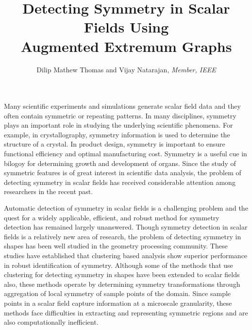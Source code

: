 \documentclass[review,journal]{vgtc}         %
\title{Detecting Symmetry in Scalar Fields Using\\Augmented Extremum Graphs}
\author{Dilip Mathew Thomas and Vijay Natarajan, \textit{Member, IEEE}}
\begin{document}

\maketitle
Many scientific experiments and simulations generate scalar field data and 
they often contain symmetric or repeating patterns. In many disciplines, 
symmetry plays an important role in studying the underlying scientific phenomena. 
For example, in crystallography, symmetry information is used to determine 
the structure of a crystal. In product design, symmetry is important to ensure
functional efficiency and optimal manufacturing cost. Symmetry is a 
useful cue in bilogoy for determining growth and development of organs. Since 
the study of symmetric features is of great interest in scientific data 
analysis, the problem of detecting symmetry in scalar fields has received 
considerable attention among researchers in the recent past.

Automatic detection of symmetry in scalar fields is a challenging problem and 
the quest for a widely applicable, efficient, and robust method for symmetry 
detection has remained largely unanswered. Though symmetry detection in scalar
fields is a relatively new area of research, the problem of detecting symmetry
in shapes has been well studied in the geometry processing community.
These studies have established that clustering based analysis show superior
performance in robust identification of symmetry. Although some of the methods
that use clustering for detecting symmetry in shapes have been extended to
scalar fields also, these methods operate by determining symmetry
transformations through aggregation of local symmetry of sample points of the
domain. Since sample points in a scalar field capture information at a
microscale granularity, these methods face difficulties in extracting and
representing symmetric regions and are also computationally inefficient.
\end{document}
